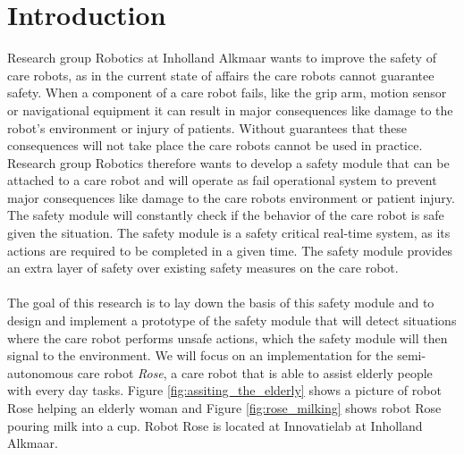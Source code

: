 \documentclass[12pt]{scrreprt}
\begin{document}
\tableofcontents
\listoffigures
\listoftables
\newpage
{}

\chapter{Introduction}
\label{Introduction}
Research group Robotics at Inholland Alkmaar wants to improve the safety of care robots, as in the current state of affairs the care robots cannot guarantee safety. When a component of a care robot fails, like the grip arm, motion sensor or navigational equipment it can result in major consequences like damage to the robot's environment or injury of patients. Without guarantees that these consequences will not take place the care robots cannot be used in practice. Research group Robotics therefore wants to develop a safety module that can be attached to a care robot and will operate as fail operational system to prevent major consequences like damage to the care robots environment or patient injury. The safety module will constantly check if the behavior of the care robot is safe given the situation. The safety module is a safety critical real-time system, as its actions are required to be completed in a given time. The safety module provides an extra layer of safety over existing safety measures on the care robot.
\\\\
The goal of this research is to lay down the basis of this safety module and to design and implement a prototype of the safety module that will detect situations where the care robot performs unsafe actions, which the safety module will then signal to the environment. We will focus on an implementation for the semi-autonomous care robot \textit{Rose}, a care robot that is able to assist elderly people with every day tasks. Figure \ref{fig:assiting_the_elderly} shows a picture of robot Rose helping an elderly woman and Figure \ref{fig:rose_milking} shows robot Rose pouring milk into a cup. Robot Rose is located at Innovatielab at Inholland Alkmaar.
\\\\
\end{document}
